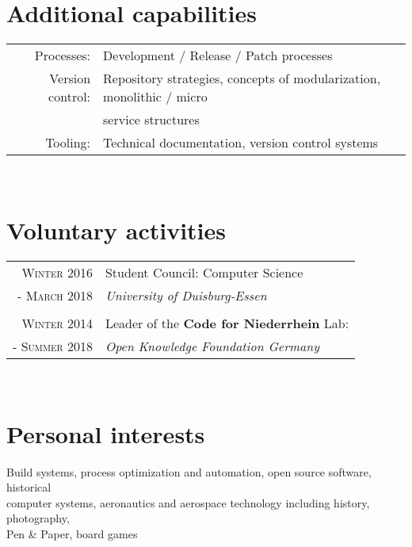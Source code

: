 \documentclass[10pt,a4paper]{article}
\begin{document}
\section{Additional capabilities}

\begin{tabular}{rl}
	Processes:			& Development / Release / Patch processes \\
	Version control:			& Repository strategies, concepts of modularization, monolithic / micro \\
						& service structures \\
	Tooling:				& Technical documentation, version control systems \\
\end{tabular} \\


\section{Voluntary activities}

\begin{tabular}{rl}
	\textsc{Winter} 2016		& Student Council: Computer Science \\
	- \textsc{March} 2018	& \emph{University of Duisburg-Essen} \\
	& \\
	
	\textsc{Winter} 2014		& Leader of the \textbf{Code for Niederrhein} Lab: \\
	- \textsc{Summer} 2018	& \emph{Open Knowledge Foundation Germany} \\
\end{tabular} \\


\section{Personal interests}
Build systems, process optimization and automation, open source software, historical \\
computer systems, aeronautics and aerospace technology including history, photography, \\
Pen \& Paper, board games
\end{document}
